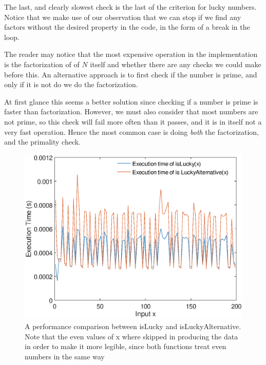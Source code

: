 \documentclass[10pt]{article}
\begin{document}
The last, and clearly slowest check is the last  of the criterion for lucky numbers. Notice that we make use of our observation that we can stop if we find any factors without the desired property in the code, in the form of a break in the loop.

The reader may notice that the most expensive operation in the implementation is the factorization of of $N$ itself and whether there are any checks we could make before this. An alternative approach is to first check if the number is prime, and only if it is not do we do the factorization. 

At first glance this seems a better solution since checking if a number is prime is faster than factorization. However, we must also consider that most numbers are not prime, so this check will fail more often than it passes, and it is in itself not a very fast operation. Hence the most common case is doing \emph{both} the factorization, and the primality check.

\begin{center}
\begin{figure}

   \includegraphics[scale=0.6]{islucky_test.eps}

   \caption{A performance comparison between isLucky and isLuckyAlternative. Note that the even values of x where skipped in producing the data in order to make it more legible, since both functions treat even numbers in the same way}
      \label{isluckytest}
\end{figure}
\end{center}
\end{document}
